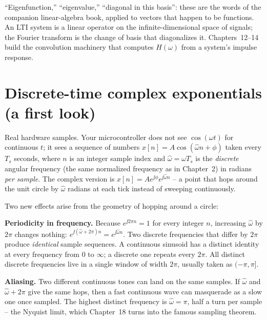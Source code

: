 \begin{connectionbox}
``Eigenfunction,'' ``eigenvalue,'' ``diagonal in this basis'': these are the words of the
companion linear-algebra book, applied to vectors that happen to be functions. An LTI system is a
linear operator on the infinite-dimensional space of signals; the Fourier transform is the change
of basis that diagonalizes it. Chapters~12--14 build the convolution machinery that computes
$H(\omega)$ from a system's impulse response.
\end{connectionbox}

\section{Discrete-time complex exponentials (a first look)}
\label{ch04:discrete}

Real hardware samples. Your microcontroller does not see $\cos(\omega t)$ for continuous $t$; it
sees a sequence of numbers $x[n] = A\cos(\hat\omega n + \phi)$ taken every $T_s$ seconds, where $n$ is
an integer sample index and $\hat\omega = \omega T_s$ is the \emph{discrete} angular frequency (the same normalized frequency as in Chapter~2) in
radians \emph{per sample}. The complex version is $x[n] = A e^{\jj\phi} e^{\jj\hat\omega n}$ -- a point
that hops around the unit circle by $\hat\omega$ radians at each tick instead of sweeping continuously.

Two new effects arise from the geometry of hopping around a circle:

\textbf{Periodicity in frequency.} Because $e^{\jj 2\pi n} = 1$ for every integer $n$, increasing
$\hat\omega$ by $2\pi$ changes nothing: $e^{\jj(\hat\omega + 2\pi)n} = e^{\jj\hat\omega n}$. Two
discrete frequencies that differ by $2\pi$ produce \emph{identical} sample sequences. A continuous
sinusoid has a distinct identity at every frequency from $0$ to $\infty$; a discrete one repeats
every $2\pi$. All distinct discrete frequencies live in a single window of width $2\pi$, usually
taken as $(-\pi, \pi]$.

\textbf{Aliasing.} Two different continuous tones can land on the same samples. If $\hat\omega$ and
$\hat\omega + 2\pi$ give the same hops, then a fast continuous wave can masquerade as a slow one once
sampled. The highest distinct frequency is $\hat\omega = \pi$, half a turn per sample -- the Nyquist
limit, which Chapter~18 turns into the famous sampling theorem.

